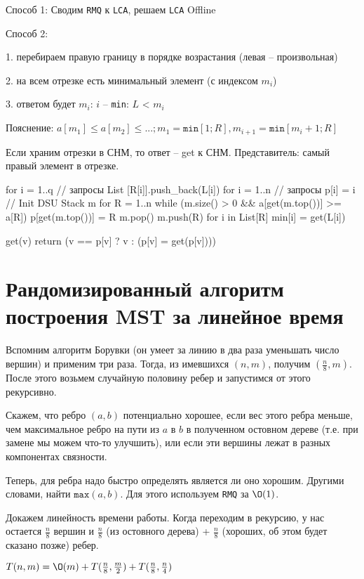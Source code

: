 	Способ 1: Сводим \texttt{RMQ} к \texttt{LCA}, решаем \texttt{LCA} Offline 

	Способ 2: 

		1. перебираем правую границу в порядке возрастания (левая – произвольная) 

		2. на всем отрезке есть минимальный элемент (с индексом $m_i$) 

		3. ответом будет $m_i$: $i$ – \texttt{min}: $L$ < $m_i$ 

	Пояснение:   $a[m_1] \le a[m_2] \le ...; m_1 = \texttt{min}[1; R], m_{i+1} = \texttt{min}[m_i + 1; R]$ 

	Если храним отрезки в СНМ, то ответ – get к СНМ. Представитель: самый правый элемент в отрезке.


\begin{cppcode}
for i = 1..q // запросы 
	List [R[i]].push\_back(L[i])
for i = 1..n // запросы
	p[i] = i // Init DSU
Stack m
for R = 1..n
	while (m.size() > 0 \&\&  a[get(m.top())] >= a[R])
		p[get(m.top())] = R
		m.pop()
	m.push(R)
	for i in List[R]
		min[i] = get(L[i])

get(v)
	return (v == p[v] ? v : (p[v] = get(p[v])))
\end{cppcode}

  \section{Рандомизированный алгоритм построения MST за линейное время}

	Вспомним алгоритм Борувки (он умеет за линию в два раза уменьшать число вершин) и применим три раза. Тогда, из имевшихся $(n, m)$, получим $(\frac{n}{8}, m)$. После этого возьмем случайную половину ребер и запустимся от этого рекурсивно. 

	Скажем, что ребро $(a, b)$ потенциально хорошее, если вес этого ребра меньше, чем максимальное ребро на пути из $a$ в $b$ в полученном остовном дереве (т.е. при замене мы можем что-то улучшить), или если эти вершины лежат в разных компонентах связности. 

	Теперь, для ребра надо быстро определять является ли оно хорошим. Другими словами, найти $\texttt{max}(a, b)$. Для этого используем \texttt{RMQ} за $\O(1)$. 

	Докажем линейность времени работы. Когда переходим в рекурсию, у нас остается $\frac{n}{8}$ вершин и $\frac{n}{8}$ (из остовного дерева) + $\frac{n}{8}$ (хороших, об этом будет сказано позже) ребер. 

	$T(n, m) = \O(m) + T(\frac{n}{8}, \frac{m}{2}) + T(\frac{n}{8}, \frac{n}{4})$ 

